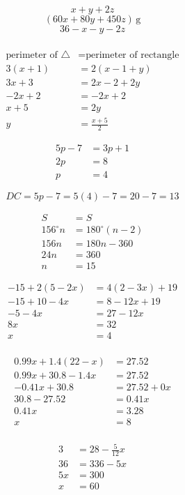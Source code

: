 \documentclass[]{article}
\begin{document}
\newpage
\[x+y+2z\]
\[(60x+80y+450z)\,\mathrm{g}\]
\[36-x-y-2z\]
\\
\[\begin{aligned}
    \text{perimeter of }\triangle&=\text{perimeter of rectangle}\\
    3(x+1)&=2(x-1+y)\\
    3x+3&=2x-2+2y\\
    -2x+2&=-2x+2\\
    \hline
    x+5&=2y\\
    y&=\boxed{\frac{x+5}2}
\end{aligned}\]

\[\begin{aligned}
    5p-7&=3p+1\\
    2p&=8\\
    p&=4
\end{aligned}\]

\[DC=5p-7=5(4)-7=20-7=13\]

\[\begin{aligned}
    S&=S\\
    156^\circ n&=180^\circ(n-2)\\
    156n&=180n-360\\
    24n&=360\\
    n&=15
\end{aligned}\]

\newpage

\[\begin{aligned}
    -15+2(5-2x)&=4(2-3x)+19\\
    -15+10-4x&=8-12x+19\\
    -5-4x&=27-12x\\
    8x&=32\\
    x&=\boxed4\\
\end{aligned}\]

\[\begin{aligned}
    0.99x+1.4(22-x)&=27.52\\
    0.99x+30.8-1.4x&=27.52\\
    -0.41x+30.8&=27.52+0x\\
    30.8-27.52&=0.41x\\
    0.41x&=3.28\\
    x&=\boxed8\\
\end{aligned}\]

\[\begin{aligned}
    3&=28-\frac5{12}x\\
    36&=336-5x\\
    5x&=300\\
    x&=\boxed{60}
\end{aligned}\]
\end{document}
